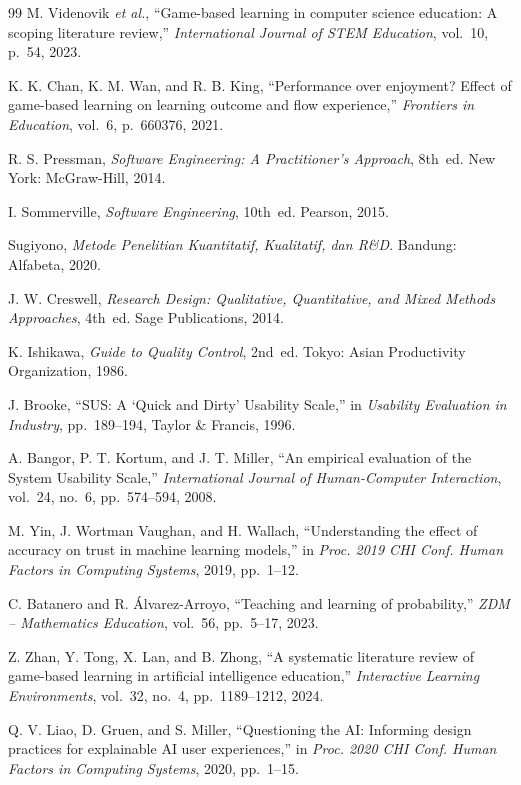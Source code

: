 \documentclass[12pt,a4paper,oneside,openany]{report}
\begin{document}
\begin{thebibliography}{99}
M. Videnovik \textit{et al.}, ``Game-based learning in computer science education: A scoping literature review,'' \textit{International Journal of STEM Education}, vol.~10, p.~54, 2023.

K. K. Chan, K. M. Wan, and R. B. King, ``Performance over enjoyment? Effect of game-based learning on learning outcome and flow experience,'' \textit{Frontiers in Education}, vol.~6, p.~660376, 2021.

R. S. Pressman, \textit{Software Engineering: A Practitioner's Approach}, 8th~ed. New York: McGraw-Hill, 2014.

I. Sommerville, \textit{Software Engineering}, 10th~ed. Pearson, 2015.

Sugiyono, \textit{Metode Penelitian Kuantitatif, Kualitatif, dan R\&D}. Bandung: Alfabeta, 2020.

J. W. Creswell, \textit{Research Design: Qualitative, Quantitative, and Mixed Methods Approaches}, 4th~ed. Sage Publications, 2014.

K. Ishikawa, \textit{Guide to Quality Control}, 2nd~ed. Tokyo: Asian Productivity Organization, 1986.

J. Brooke, ``SUS: A `Quick and Dirty' Usability Scale,'' in \textit{Usability Evaluation in Industry}, pp.~189--194, Taylor \& Francis, 1996.

A. Bangor, P. T. Kortum, and J. T. Miller, ``An empirical evaluation of the System Usability Scale,'' \textit{International Journal of Human-Computer Interaction}, vol.~24, no.~6, pp.~574--594, 2008.

M. Yin, J. Wortman Vaughan, and H. Wallach, ``Understanding the effect of accuracy on trust in machine learning models,'' in \textit{Proc. 2019 CHI Conf. Human Factors in Computing Systems}, 2019, pp.~1--12.

C. Batanero and R. \'Alvarez-Arroyo, ``Teaching and learning of probability,'' \textit{ZDM -- Mathematics Education}, vol.~56, pp.~5--17, 2023.

Z. Zhan, Y. Tong, X. Lan, and B. Zhong, ``A systematic literature review of game-based learning in artificial intelligence education,'' \textit{Interactive Learning Environments}, vol.~32, no.~4, pp.~1189--1212, 2024.

Q. V. Liao, D. Gruen, and S. Miller, ``Questioning the AI: Informing design practices for explainable AI user experiences,'' in \textit{Proc. 2020 CHI Conf. Human Factors in Computing Systems}, 2020, pp.~1--15.


\end{thebibliography}
\end{document}
